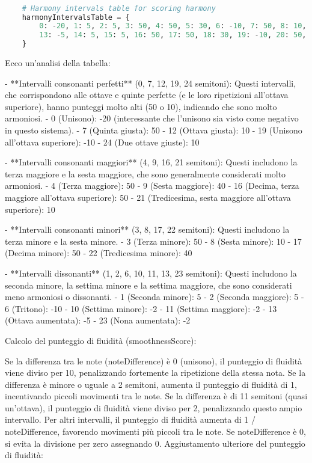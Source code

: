 \documentclass[a4paper,12pt]{report}
\begin{document}
\begin{lstlisting}[language=Python]

    # Harmony intervals table for scoring harmony
    harmonyIntervalsTable = {
        0: -20, 1: 5, 2: 5, 3: 50, 4: 50, 5: 30, 6: -10, 7: 50, 8: 10, 9: 40, 10: -2, 11: -2, 12: 10,
        13: -5, 14: 5, 15: 5, 16: 50, 17: 50, 18: 30, 19: -10, 20: 50, 21: 10, 22: 40, 23: -2, 24: -2, 25: 10
    }

\end{lstlisting}

Ecco un'analisi della tabella:

- **Intervalli consonanti perfetti** (0, 7, 12, 19, 24 semitoni): Questi intervalli, che corrispondono alle ottave e quinte perfette (e le loro ripetizioni all'ottava superiore), hanno punteggi molto alti (50 o 10), indicando che sono molto armoniosi.
    - 0 (Unisono): -20 (interessante che l'unisono sia visto come negativo in questo sistema).
    - 7 (Quinta giusta): 50
    - 12 (Ottava giusta): 10
    - 19 (Unisono all'ottava superiore): -10
    - 24 (Due ottave giuste): 10

- **Intervalli consonanti maggiori** (4, 9, 16, 21 semitoni): Questi includono la terza maggiore e la sesta maggiore, che sono generalmente considerati molto armoniosi.
    - 4 (Terza maggiore): 50
    - 9 (Sesta maggiore): 40
    - 16 (Decima, terza maggiore all'ottava superiore): 50
    - 21 (Tredicesima, sesta maggiore all'ottava superiore): 10

- **Intervalli consonanti minori** (3, 8, 17, 22 semitoni): Questi includono la terza minore e la sesta minore.
    - 3 (Terza minore): 50
    - 8 (Sesta minore): 10
    - 17 (Decima minore): 50
    - 22 (Tredicesima minore): 40

- **Intervalli dissonanti** (1, 2, 6, 10, 11, 13, 23 semitoni): Questi includono la seconda minore, la settima minore e la settima maggiore, che sono considerati meno armoniosi o dissonanti.
    - 1 (Seconda minore): 5
    - 2 (Seconda maggiore): 5
    - 6 (Tritono): -10
    - 10 (Settima minore): -2
    - 11 (Settima maggiore): -2
    - 13 (Ottava aumentata): -5
    - 23 (Nona aumentata): -2
    
Calcolo del punteggio di fluidità (smoothnessScore):

Se la differenza tra le note (noteDifference) è 0 (unisono), il punteggio di fluidità viene diviso per 10, penalizzando fortemente la ripetizione della stessa nota.
Se la differenza è minore o uguale a 2 semitoni, aumenta il punteggio di fluidità di 1, incentivando piccoli movimenti tra le note.
Se la differenza è di 11 semitoni (quasi un'ottava), il punteggio di fluidità viene diviso per 2, penalizzando questo ampio intervallo.
Per altri intervalli, il punteggio di fluidità aumenta di 1 / noteDifference, favorendo movimenti più piccoli tra le note. 
Se noteDifference è 0, si evita la divisione per zero assegnando 0.
Aggiustamento ulteriore del punteggio di fluidità:
\end{document}
